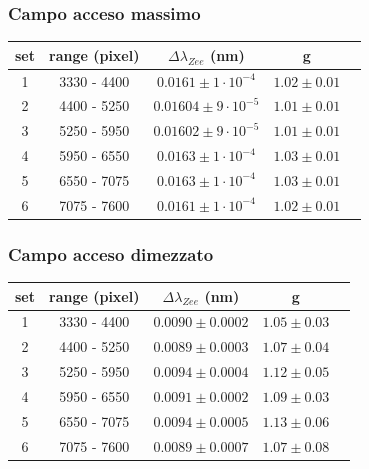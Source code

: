 \documentclass{article}
\begin{document}
 \subsubsection{Campo acceso massimo}
\begin{center}
\begin{tabular} {ccccc}
	\toprule
set	& range (pixel)& $\Delta\lambda_{Zee} $ (nm) & g \\
\midrule
1	&	3330	-	4400	&  $0.0161 \pm  1\cdot 10^{-4}$	&$1.02 \pm 0.01$\\  
2	& 	4400	-	5250	&  $0.01604 \pm 9\cdot 10^{-5}$&$1.01 \pm0.01$\\ 
3	&	5250	-	5950	&	$0.01602 \pm 9\cdot10^{-5}$&$1.01 \pm 0.01$\\
4	&	5950	-	6550	&	$0.0163 \pm 1\cdot 10^{-4}$&$1.03 \pm 0.01$\\
5	&	6550	-	7075	&	$0.0163 \pm1\cdot 10^{-4}$&	$1.03  \pm 0.01$	\\
6	&	7075	-	7600	&	$0.0161\pm1\cdot 10^{-4}$&	$1.02 \pm 0.01$	\\
\bottomrule
\end{tabular}
\end{center}

 \subsubsection{Campo acceso dimezzato}
\begin{center}
	\begin{tabular} {ccccc}
		\toprule
		set	& range (pixel)& $\Delta\lambda_{Zee} $ (nm) & g \\
		\midrule
		1	&	3330	-	4400	&  $    0.0090 \pm  0.0002$	&$1.05 \pm 0.03$\\  
		2	& 	4400	-	5250	&  $0.0089 \pm 0.0003$&$1.07 \pm0.04$\\ 
		3	&	5250	-	5950	&	$0.0094\pm 0.0004$&$1.12 \pm 0.05$\\
		4	&	5950	-	6550	&	$0.0091\pm 0.0002$&$1.09 \pm 0.03$\\
		5	&	6550	-	7075	&	$0.0094 \pm0.0005$&	$1.13 \pm 0.06$	\\
		6	&	7075	-	7600	&	$0.0089\pm 0.0007$&	$1.07 \pm 0.08$	\\
		\bottomrule
	\end{tabular}
\end{center}
   
\end{document}
